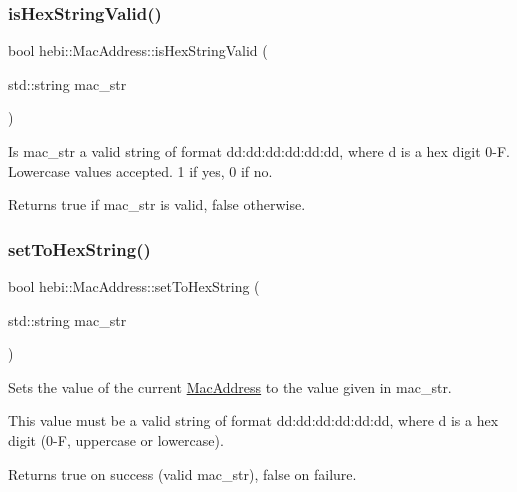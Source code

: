 \subsubsection{\texorpdfstring{is\+Hex\+String\+Valid()}{isHexStringValid()}}
{\footnotesize\ttfamily bool hebi\+::\+Mac\+Address\+::is\+Hex\+String\+Valid (\begin{DoxyParamCaption}\item[{std\+::string}]{mac\+\_\+str }\end{DoxyParamCaption})\hspace{0.3cm}{\ttfamily [static]}}



Is mac\+\_\+str a valid string of format dd\+:dd\+:dd\+:dd\+:dd\+:dd, where \textquotesingle{}d\textquotesingle{} is a hex digit 0-\/F. Lowercase values accepted. 1 if yes, 0 if no. 

\begin{DoxyReturn}{Returns}
\textquotesingle{}true\textquotesingle{} if mac\+\_\+str is valid, \textquotesingle{}false\textquotesingle{} otherwise. 
\end{DoxyReturn}
\mbox{\label{classhebi_1_1MacAddress_a3e661d4efb84ca1743f5fe6acfd8ed8c}} 
\subsubsection{\texorpdfstring{set\+To\+Hex\+String()}{setToHexString()}}
{\footnotesize\ttfamily bool hebi\+::\+Mac\+Address\+::set\+To\+Hex\+String (\begin{DoxyParamCaption}\item[{std\+::string}]{mac\+\_\+str }\end{DoxyParamCaption})}



Sets the value of the current \hyperlink{classhebi_1_1MacAddress}{Mac\+Address} to the value given in \textquotesingle{}mac\+\_\+str\textquotesingle{}. 

This value must be a valid string of format dd\+:dd\+:dd\+:dd\+:dd\+:dd, where \textquotesingle{}d\textquotesingle{} is a hex digit (0-\/F, uppercase or lowercase).

\begin{DoxyReturn}{Returns}
\textquotesingle{}true\textquotesingle{} on success (valid mac\+\_\+str), \textquotesingle{}false\textquotesingle{} on failure. 
\end{DoxyReturn}


